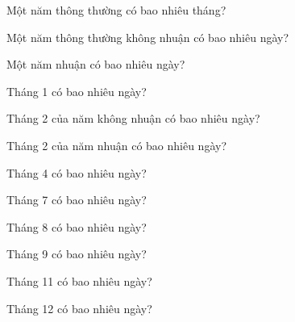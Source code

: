 \begin{ex}
Một năm thông thường có bao nhiêu tháng?
\end{ex}

\begin{ex}
Một năm thông thường không nhuận có bao nhiêu ngày?
\end{ex}

\begin{ex}
Một năm nhuận có bao nhiêu ngày?
\end{ex}

\begin{ex}
Tháng 1 có bao nhiêu ngày?
\end{ex}

\begin{ex}
Tháng 2 của năm không nhuận có bao nhiêu ngày?
\end{ex}

\begin{ex}
Tháng 2 của năm nhuận có bao nhiêu ngày?
\end{ex}

\begin{ex}
Tháng 4 có bao nhiêu ngày?
\end{ex}

\begin{ex}
Tháng 7 có bao nhiêu ngày?
\end{ex}

\begin{ex}
Tháng 8 có bao nhiêu ngày?
\end{ex}

\begin{ex}
Tháng 9 có bao nhiêu ngày?
\end{ex}

\begin{ex}
Tháng 11 có bao nhiêu ngày?
\end{ex}

\begin{ex}
Tháng 12 có bao nhiêu ngày?
\end{ex}

